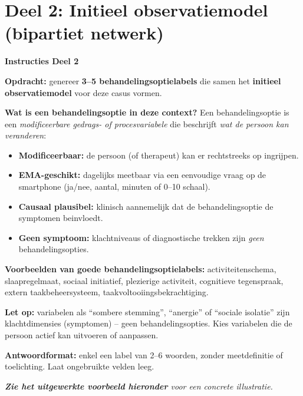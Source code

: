 \documentclass[11pt,a4paper]{article}
\begin{document}
\vspace{0.6em}

\newpage


\section{Deel 2: Initieel observatiemodel (bipartiet netwerk)}

\begin{tcolorbox}[colback=green!3,colframe=ForestGreen,arc=2.5mm,boxrule=0.9pt,
  left=10pt,right=10pt,top=9pt,bottom=9pt]
\textbf{\color{ForestGreen}Instructies Deel 2}

\smallskip\small
\textbf{Opdracht:} genereer \textbf{3--5 behandelingsoptielabels} die samen het
\textbf{initieel observatiemodel} voor deze casus vormen.

\textbf{Wat is een behandelingsoptie in deze context?}
Een behandelingsoptie is een \emph{modificeerbare gedrags- of procesvariabele} die beschrijft
\emph{wat de persoon kan veranderen}:
\begin{itemize}[topsep=2pt,itemsep=1pt]
\item \textbf{Modificeerbaar:} de persoon (of therapeut) kan er rechtstreeks op ingrijpen.
\item \textbf{EMA-geschikt:} dagelijks meetbaar via een eenvoudige vraag op de smartphone
(ja/nee, aantal, minuten of 0--10 schaal).
\item \textbf{Causaal plausibel:} klinisch aannemelijk dat de behandelingsoptie de symptomen beinvloedt.
\item \textbf{Geen symptoom:} klachtniveaus of diagnostische trekken zijn
\emph{geen} behandelingsopties.
\end{itemize}

\textbf{Voorbeelden van goede behandelingsoptielabels:}
activiteitenschema, slaapregelmaat, sociaal initiatief, plezierige activiteit,
cognitieve tegenspraak, extern taakbeheersysteem, taakvoltooiingsbekrachtiging.

\textbf{Let op:} variabelen als ``sombere stemming'', ``anergie'' of ``sociale isolatie'' zijn
klachtdimensies (symptomen) -- geen behandelingsopties. Kies variabelen die de persoon
actief kan uitvoeren of aanpassen.

\textbf{Antwoordformat:} enkel een label van 2--6 woorden, zonder meetdefinitie of toelichting.
Laat ongebruikte velden leeg.

\medskip
\textit{\textbf{Zie het uitgewerkte voorbeeld hieronder} voor een concrete illustratie.}
\end{tcolorbox}
\end{document}
